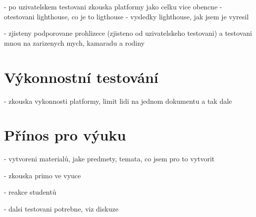 - po uzivatelskem testovani zkouska platformy jako celku vice obencne
- otestovani lighthouse, co je to ligthouse
- vysledky lighthouse, jak jsem je vyresil

- zjisteny podporovane prohlizece (zjisteno od uzivatelskeho testovani) a testovani mnou na zarizenych mych, kamaradu a rodiny

\section{Výkonnostní testování}

- zkouska vykonnosti platformy, limit lidi na jednom dokumentu a tak dale

\section{Přínos pro výuku}

- vytvoreni materialů, jake predmety, temata, co jsem pro to vytvorit

- zkouska primo ve vyuce

- reakce studentů

- dalsi testovani potrebne, viz diskuze
